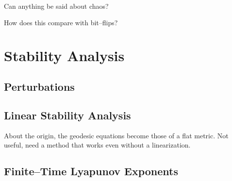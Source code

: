 Can anything be said about chaos?

How does this compare with bit--flips?



\section{Stability Analysis}

\subsection{Perturbations}

\subsection{Linear Stability Analysis}

About the origin, the geodesic equations become those of a flat metric.
Not useful, need a method that works even without a linearization.

\subsection{Finite--Time Lyapunov Exponents}


